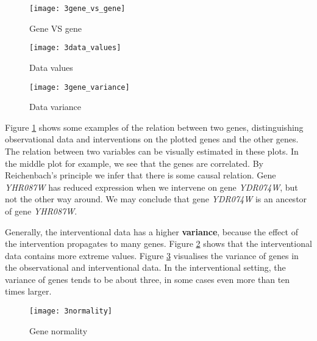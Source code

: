 \begin{figure}[h]
    \centering
    \texttt{[image: 3gene\_vs\_gene]}
    \caption{Gene VS gene }
    \label{fig:3:genevsgene}
\end{figure}

\begin{figure}[h]
    \centering
    \texttt{[image: 3data\_values]}
    \caption{Data values}
    \label{fig:3:datavalues}
\end{figure}

\begin{figure}[h]
    \centering
    \texttt{[image: 3gene\_variance]}
    \caption{Data variance }
    \label{fig:3:datavariance}
\end{figure}

Figure \ref{fig:3:genevsgene} shows some examples of the relation between two genes, distinguishing observational data and interventions on the plotted genes and the other genes. The relation between two variables can be visually estimated in these plots. In the middle plot for example, we see that the genes are correlated. By Reichenbach's principle we infer that there is some causal relation. Gene \textit{YHR087W} has reduced expression when we intervene on gene \textit{YDR074W}, but not the other way around. We may conclude that gene \textit{YDR074W} is an ancestor of gene \textit{YHR087W}.

Generally, the interventional data has a higher \textbf{variance}, because the effect of the intervention propagates to many genes. Figure \ref{fig:3:datavalues} shows that the interventional data contains more extreme values. Figure \ref{fig:3:datavariance} visualises the variance of genes in the observational and interventional data. In the interventional setting, the variance of genes tends to be about three, in some cases even more than ten times larger.

\begin{figure}[h]
    \centering
    \texttt{[image: 3normality]}
    \caption{Gene normality}
    \label{fig:3:normality}
\end{figure}   

